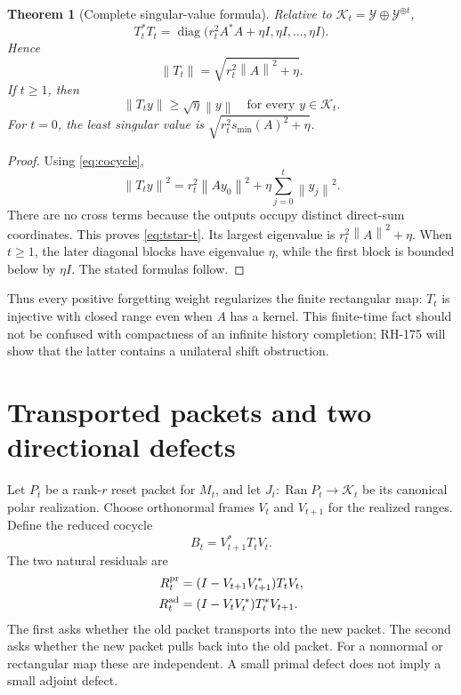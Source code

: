 \documentclass[12pt]{article}
\newtheorem{theorem}{Theorem}[section]
\theoremstyle{definition}
\theoremstyle{remark}
\newcommand{\cY}{\mathcal Y}
\newcommand{\cK}{\mathcal K}
\newcommand{\Ran}{\operatorname{Ran}}
\newcommand{\norm}[1]{\left\lVert#1\right\rVert}
\begin{document}
\begin{theorem}[Complete singular-value formula]\label{thm:singular}
Relative to $\cK_t=\cY\oplus\cY^{\oplus t}$,
\begin{equation}\label{eq:tstar-t}
 T_t^*T_t=
 \operatorname{diag}\bigl(r_t^2A^*A+\eta I,
 \eta I,\ldots,\eta I\bigr).
\end{equation}
Hence
\begin{equation}\label{eq:norm}
 \norm{T_t}=\sqrt{r_t^2\norm A^2+\eta}.
\end{equation}
If $t\ge1$, then
\begin{equation}\label{eq:lower}
 \norm{T_ty}\ge\sqrt\eta\norm y
 \quad\text{for every }y\in\cK_t.
\end{equation}
For $t=0$, the least singular value is
$\sqrt{r_t^2s_{\min}(A)^2+\eta}$.
\end{theorem}

\begin{proof}
Using \eqref{eq:cocycle},
\[
 \norm{T_ty}^2
 =r_t^2\norm{Ay_0}^2+\eta\sum_{j=0}^t\norm{y_j}^2.
\]
There are no cross terms because the outputs occupy distinct direct-sum
coordinates.  This proves \eqref{eq:tstar-t}.  Its largest eigenvalue is
$r_t^2\norm A^2+\eta$.  When $t\ge1$, the later diagonal blocks have
eigenvalue $\eta$, while the first block is bounded below by $\eta I$.
The stated formulas follow.
\end{proof}

Thus every positive forgetting weight regularizes the finite rectangular
map: $T_t$ is injective with closed range even when $A$ has a kernel.  This
finite-time fact should not be confused with compactness of an infinite
history completion; RH-175 will show that the latter contains a unilateral
shift obstruction.

\section{Transported packets and two directional defects}

Let $P_t$ be a rank-$r$ reset packet for $M_t$, and let
$J_t:\Ran P_t\to\cK_t$ be its canonical polar realization.  Choose
orthonormal frames $V_t$ and $V_{t+1}$ for the realized ranges.  Define the
reduced cocycle
\begin{equation}\label{eq:reduced}
 B_t=V_{t+1}^*T_tV_t.
\end{equation}
The two natural residuals are
\begin{align}
 R_t^{\rm pr}&=(I-V_{t+1}V_{t+1}^*)T_tV_t,
 \label{eq:primal}\\
 R_t^{\rm ad}&=(I-V_tV_t^*)T_t^*V_{t+1}.
 \label{eq:adjoint-residual}
\end{align}
The first asks whether the old packet transports into the new packet.  The
second asks whether the new packet pulls back into the old packet.  For a
nonnormal or rectangular map these are independent.  A small primal defect
does not imply a small adjoint defect.
\end{document}
